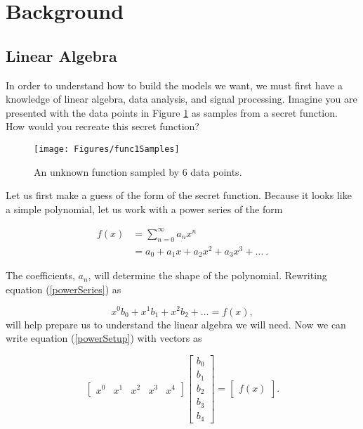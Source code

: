 \section{Background}\label{Sect:background}
\subsection{Linear Algebra}\label{Sect:linearAlgebra}
In order to understand how to build the models we want, we must first have a knowledge of linear algebra, data analysis, and signal processing. Imagine you are presented with the data points in Figure \ref{figFunc1Samples} as samples from a secret function. How would you recreate this secret function?

\begin{figure}[h]
\texttt{[image: Figures/func1Samples]}
\caption{An unknown function sampled by 6 data points.
\label{figFunc1Samples}} 
\end{figure}

\par Let us first make a guess of the form of the secret function. Because it looks like a simple polynomial, let us work with a power series of the form

\begin{align}
f(x) &= \sum_{n=0}^\infty a_n x^n
	\label{powerSum}\\ 
&= a_0 + a_1x + a_2x^2 + a_3x^3 +\ldots \ .
	\label{powerSeries}
\end{align}

\par The coefficients, $a_n$, will determine the shape of the polynomial. Rewriting equation (\ref{powerSeries}) as

\begin{equation} \label{powerSetup}
x^0b_0 + x^1b_1 + x^2b_2 + \ldots = f(x),
\end{equation}
will help prepare us to understand the linear algebra we will need. Now we can write equation (\ref{powerSetup}) with vectors as

\begin{equation} \label{powerVectors}
\begin{bmatrix}
x^0 & x^1 & x^2 & x^3 & x^4
\end{bmatrix}
\begin{bmatrix}
b_0 \\
b_1 \\
b_2 \\
b_3 \\
b_4 
\end{bmatrix}
=
\begin{bmatrix}
f(x)
\end{bmatrix} .
\end{equation}

